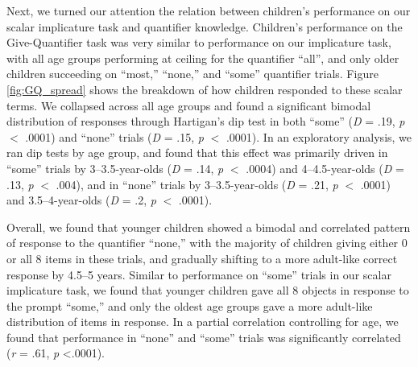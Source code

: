 \documentclass[man]{apa2}
\begin{document}
Next, we turned our attention the relation between children's performance on our scalar implicature task and quantifier knowledge. Children's performance on the Give-Quantifier task was very similar to performance on our implicature task, with all age groups performing at ceiling for the quantifier ``all'', and only older children succeeding on ``most,'' ``none,'' and ``some'' quantifier trials. Figure \ref{fig:GQ_spread} shows the breakdown of how children responded to these scalar terms. We collapsed across all age groups and found a significant bimodal distribution of responses through Hartigan's dip test in both ``some'' (\emph{D} = .19, \emph{p} $<$ .0001) and ``none'' trials (\emph{D} = .15, \emph{p} $<$ .0001). In an exploratory analysis, we ran dip tests by age group, and found that this effect was primarily driven in ``some'' trials by 3--3.5-year-olds (\emph{D} = .14, \emph{p} $<$ .0004) and 4--4.5-year-olds (\emph{D} = .13, \emph{p} $<$ .004), and in ``none'' trials by 3--3.5-year-olds (\emph{D} = .21, \emph{p} $<$ .0001) and 3.5--4-year-olds (\emph{D} = .2, \emph{p} $<$ .0001).

Overall, we found that younger children showed a bimodal and correlated pattern of response to the quantifier ``none,'' with the majority of children giving either 0 or all 8 items in these trials, and gradually shifting to a more adult-like correct response by 4.5--5 years. Similar to performance on ``some'' trials in our scalar implicature task, we found that younger children gave all 8 objects in response to the prompt ``some,'' and only the oldest age groups gave a more adult-like distribution of items in response. In a partial correlation controlling for age, we found that performance in ``none'' and ``some'' trials was significantly correlated (\textit{r} = .61, \textit{p} \textless .0001).
\end{document}
